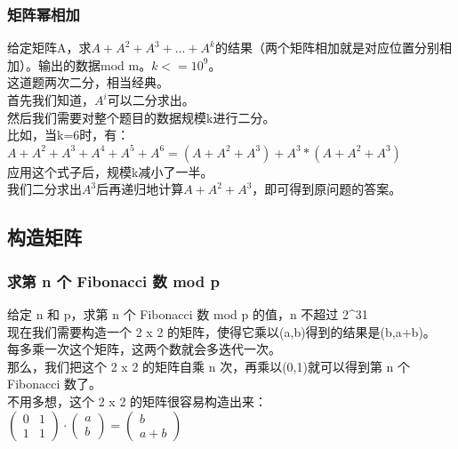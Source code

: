 \documentclass[a4paper]{article}
\begin{document}
\begin{CJK*}{UTF8}{gbsn}
\begin{multicols}{3}
\begin{flushleft}
\subsubsection{矩阵幂相加}
给定矩阵A，求$A + A^2 + A^3 + ... + A^k$的结果（两个矩阵相加就是对应位置分别相加）。输出的数据mod m。$k<=10^9$。\\
这道题两次二分，相当经典。\\
首先我们知道，$A^i$可以二分求出。\\
然后我们需要对整个题目的数据规模k进行二分。\\
比如，当k=6时，有：$A + A^2 + A^3 + A^4 + A^5 + A^6 =(A + A^2 + A^3) + A^3*(A + A^2 + A^3)$\\
应用这个式子后，规模k减小了一半。\\
我们二分求出$A^3$后再递归地计算$A + A^2 + A^3$，即可得到原问题的答案。\\

\subsection{构造矩阵}

\subsubsection{求第 n 个 Fibonacci 数 mod p}
给定 n 和 p，求第 n 个 Fibonacci 数 mod p 的值，n 不超过 2\^{}31\\
现在我们需要构造一个 2 x 2 的矩阵，使得它乘以(a,b)得到的结果是(b,a+b)。\\
每多乘一次这个矩阵，这两个数就会多迭代一次。\\
那么，我们把这个 2 x 2 的矩阵自乘 n 次，再乘以(0,1)就可以得到第 n 个 Fibonacci 数了。\\
不用多想，这个 2 x 2 的矩阵很容易构造出来：\\
\begin{math}
\begin{pmatrix}
	0 & 1  \\
    1 & 1
\end{pmatrix}
\cdot
\begin{pmatrix}
	a  \\
    b 
\end{pmatrix}
=
\begin{pmatrix}
	b  \\
    a+b 
\end{pmatrix}
\end{math}


\end{flushleft}
\end{multicols}
\end{CJK*}
\end{document}
